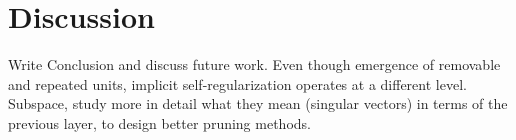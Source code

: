\section{Discussion}

Write Conclusion and discuss future work.
Even though emergence of removable and repeated units, implicit self-regularization operates at a different level. Subspace, study more in detail what they mean (singular vectors) in terms of the previous layer, to design better pruning methods.

\nocite{*}
\printbibliography


